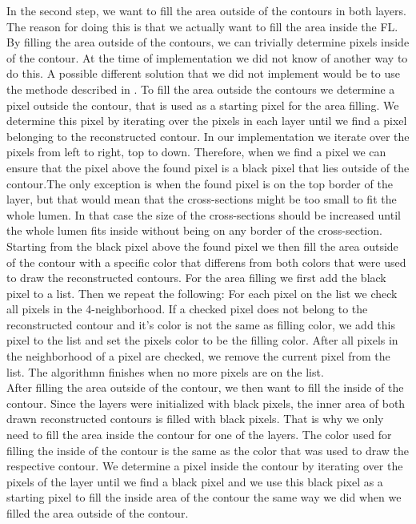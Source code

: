 \documentclass[thesis.tex]{subfiles}
\begin{document}
In the second step, we want to fill the area outside of the contours in both layers. The reason for doing this is that we actually want to fill the area inside the FL. By filling the area outside of the contours,  we can trivially determine pixels inside of the contour. At the time of implementation we did not know of another way to do this. A possible different solution that we did not implement would be to use the methode described in \cite{inside_contour}.  To fill the area outside the  contours we determine a pixel outside the contour, that is used as a starting pixel for the area filling. We determine this pixel by iterating over the pixels in each layer until we find a pixel belonging to the reconstructed contour. In our implementation we iterate over the pixels from left to right, top to down. Therefore, when we find a pixel we can ensure that the pixel above the found pixel is a black pixel that lies outside of the contour.The only exception is when the found pixel is on the top border of the layer, but that would mean that the cross-sections might be too small to fit the whole lumen. In that case the size of the cross-sections should be increased until the whole lumen fits inside without being on any border of the cross-section. \\  Starting from the black pixel above the found pixel we then fill the area outside of the contour with a specific color that differens from both colors that were used to draw the reconstructed contours. For the area filling we first add the black pixel to a list. Then we repeat the following: For each pixel on the list we check all pixels in the 4-neighborhood. If a checked pixel does not belong to the reconstructed contour and it's color is not the same as filling color, we add this pixel to the list and set the pixels color to be the filling color. After all pixels in the neighborhood of a pixel are checked, we remove the current pixel from the list. The algorithmn finishes when no more pixels are on the list. \\
After filling the area outside of the contour, we then want to fill the inside of the contour. Since the layers were initialized with black pixels, the inner area of both drawn reconstructed contours is filled with black pixels. That is why we only need to fill the area inside the contour for one of the layers. The color used for filling the inside of the contour is the same as the color that was used to draw the respective contour. We determine a pixel inside the contour by iterating over the pixels of the layer until we find a black pixel and we use this black pixel as a starting pixel to fill the inside area of the contour the same way we did when we filled the area outside of the contour. \\
\end{document}
